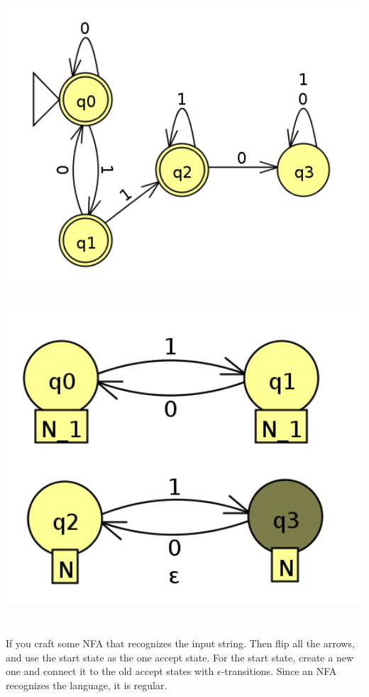 \documentclass[a4paper,12pt]{article}
\begin{document}
\section{}
\includegraphics[width=15cm]{question8}

\section{}
\includegraphics[width=15cm]{question9}

\section{}
If you craft some NFA that recognizes the input string.
Then flip all the arrows, and use the start state as the one accept state.
For the start state, create a new one and connect it to the old accept
states with $\epsilon$-transitions.
Since an NFA recognizes the language, it is regular.
\end{document}
